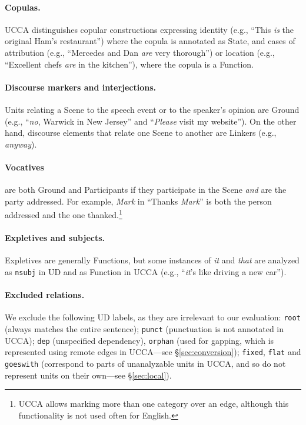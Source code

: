 \documentclass[11pt,a4paper,table]{article}
\begin{document}
\paragraph{Copulas.}
    UCCA distinguishes copular constructions expressing
    identity (e.g., ``This \textit{is} the original Ham's restaurant'') where the copula is annotated as State,
    and cases of attribution 
    (e.g., ``Mercedes and Dan \textit{are} very thorough'')
    or location (e.g., ``Excellent chefs \textit{are} in the kitchen''),
    where the copula is a Function.

\paragraph{Discourse markers and interjections.}
    Units relating a Scene to the speech event or to the speaker's opinion are Ground
    (e.g., ``\textit{no}, Warwick in New Jersey'' and ``\textit{Please} visit my website'').
    On the other hand, discourse elements that relate one Scene to another 
    are Linkers (e.g., \textit{anyway}).

\paragraph{Vocatives}
    are both Ground and Participants if they participate in the Scene \textit{and} are the party addressed.
    For example, \textit{Mark} in ``Thanks \textit{Mark}'' is both the person addressed and the one thanked.\footnote{UCCA allows marking more than one category over an edge, although this
    functionality is not used often for English.}
    
\paragraph{Expletives and subjects.}
    Expletives are generally Functions,
    but some instances of \textit{it} and \textit{that} are analyzed as \texttt{nsubj} in UD
    and as Function in UCCA (e.g., ``\textit{it}'s like driving a new car'').

\paragraph{Excluded relations.}
We exclude the following UD labels,
as they are irrelevant to our evaluation:
\texttt{root} (always matches the entire sentence);
\texttt{punct} (punctuation is not annotated in UCCA);
\texttt{dep} (unspecified dependency),
\texttt{orphan} (used for gapping, which is represented using remote edges in UCCA---see \S\ref{sec:conversion});
\texttt{fixed}, \texttt{flat} and \texttt{goeswith} (correspond to parts of unanalyzable units in UCCA,
    and so do not represent units on their own---see \S\ref{sec:local}).
\end{document}
